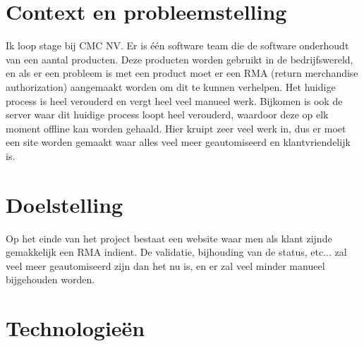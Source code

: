 

\section{Context en probleemstelling}%
\label{vst:context}

Ik loop stage bij CMC NV. Er is één software team die de software onderhoudt van een aantal producten. Deze producten worden gebruikt in de bedrijfswereld, en als er een probleem is met een product moet er een RMA (return merchandise authorization) aangemaakt worden
om dit te kunnen verhelpen. Het huidige process is heel verouderd en vergt heel veel manueel werk. Bijkomen is ook de server waar dit huidige process loopt heel verouderd, waardoor deze op elk moment offline kan worden gehaald.
Hier kruipt zeer veel werk in, dus er moet een site worden gemaakt waar alles veel meer geautomiseerd en klantvriendelijk is.


\section{Doelstelling}%
\label{vst:doelstelling}

Op het einde van het project bestaat een website waar men als klant zijnde gemakkelijk een RMA indient. De validatie, bijhouding van de status, etc... zal veel meer geautomiseerd zijn dan het nu is, en er zal veel minder manueel bijgehouden worden.


\section{Technologieën}%
\label{vst:technologieen}

